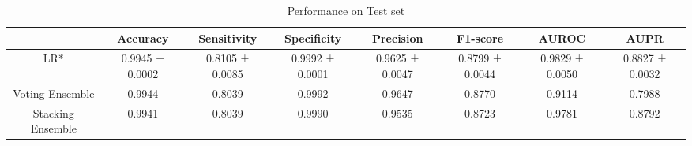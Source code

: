 \begin{table}[h!]
    \centering
    \caption{Performance on Test set}
    \begin{adjustbox}{width=\textwidth}
    \begin{tabular}{|c|c|c|c|c|c|c|c|}
    \hline
      & Accuracy & Sensitivity & Specificity & Precision & F1-score & AUROC & AUPR \\
    \hline
    LR* & 0.9945 ± 0.0002 & 0.8105 ± 0.0085 & 0.9992 ± 0.0001 & 0.9625 ± 0.0047 & 0.8799 ± 0.0044 & 0.9829 ± 0.0050 & 0.8827 ± 0.0032 \\
    \hline
    Voting Ensemble & 0.9944 & 0.8039 & 0.9992 & 0.9647 & 0.8770 & 0.9114 & 0.7988 \\
    \hline
    Stacking Ensemble & 0.9941 & 0.8039 & 0.9990 & 0.9535 & 0.8723 & 0.9781 & 0.8792 \\
    \hline
    \end{tabular}
    \end{adjustbox}
    \end{table}
    